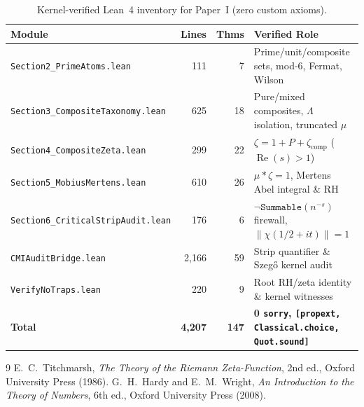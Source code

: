 \documentclass[11pt,a4paper]{article}
\theoremstyle{definition}
\begin{document}
\begin{table}[h!]
\centering
\footnotesize
\setlength{\tabcolsep}{3.5pt}
\begin{tabular}{@{}lrrl@{}}
\toprule
\textbf{Module} & \textbf{Lines} & \textbf{Thms} & \textbf{Verified Role} \\
\midrule
\texttt{Section2\_PrimeAtoms.lean} & 111 & 7 & Prime/unit/composite sets, mod-6, Fermat, Wilson \\
\texttt{Section3\_CompositeTaxonomy.lean} & 625 & 18 & Pure/mixed composites, $\Lambda$ isolation, truncated $\mu$ \\
\texttt{Section4\_CompositeZeta.lean} & 299 & 22 & $\zeta = 1 + P + \zeta_{\mathrm{comp}}$ ($\operatorname{Re}(s) > 1$) \\
\texttt{Section5\_MobiusMertens.lean} & 610 & 26 & $\mu * \zeta = 1$, Mertens Abel integral \& RH \\
\texttt{Section6\_CriticalStripAudit.lean} & 176 & 6 & $\neg\texttt{Summable}(n^{-s})$ firewall, $\|\chi(1/2+it)\| = 1$ \\
\texttt{CMIAuditBridge.lean} & 2,166 & 59 & Strip quantifier \& Szeg\H{o} kernel audit \\
\texttt{VerifyNoTraps.lean} & 220 & 9 & Root RH/zeta identity \& kernel witnesses \\
\midrule
\textbf{Total} & \textbf{4,207} & \textbf{147} & \textbf{0 \texttt{sorry}, \texttt{[propext, Classical.choice, Quot.sound]}} \\
\bottomrule
\end{tabular}
\caption{Kernel-verified Lean~4 inventory for Paper~I (zero custom axioms).}
\label{tab:paper_i_audit}
\end{table}

\begin{thebibliography}{9}
 E.~C.~Titchmarsh, \emph{The Theory of the Riemann Zeta-Function}, 2nd ed., Oxford University Press (1986).
 G.~H.~Hardy and E.~M.~Wright, \emph{An Introduction to the Theory of Numbers}, 6th ed., Oxford University Press (2008).
\end{thebibliography}
\end{document}
